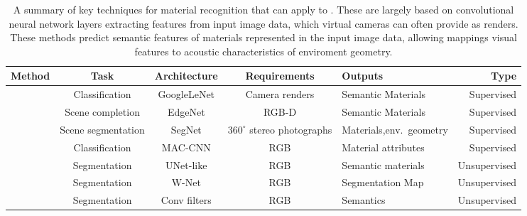 \begin{landscape}
    \begin{table}[tbp]
        \centering
        \caption[A summary of key techniques for material recognition]{A summary of key techniques for material recognition that can apply to . These are largely based on convolutional neural network layers extracting features from input image data, which virtual cameras can often provide as renders. These methods predict semantic features of materials represented in the input image data, allowing mappings visual features to acoustic characteristics of enviroment geometry.}
            
            \begin{tabularx}{\linewidth}{lcccXr}
                \toprule
                Method                                            & Task                     & Architecture   & Requirements             & Outputs             & Type       \\ \midrule
                \cite{schissler2017acoustic}                      & Classification           & GoogleLeNet    & Camera renders           & Semantic Materials  & Supervised \\
                \cite{dourado2019edgenet}                         & Scene completion         & EdgeNet        & RGB-D                    & Semantic Materials  & Supervised \\
                \cite{kim2019immersive}                           & Scene segmentation       & SegNet         & $360^\circ$ stereo \newline{} photographs & Materials,\newline env.\ geometry  & Supervised \\
                
                \cite{schwartz2019recognizing}                    & Classification           & MAC-CNN       & RGB                       & Material attributes  & Supervised \\
                \cite{gaur2019superpixel}                         & Segmentation             & UNet-like     & RGB                       & Semantic materials   & Unsupervised \\
                \cite{xia2017w}                                   & Segmentation             & W-Net         & RGB                       & Segmentation Map     & Unsupervised \\
                \cite{kiechle2018model}                           & Segmentation             & Conv filters  & RGB                       & Semantics            & Unsupervised \\ \bottomrule 
            \end{tabularx}\label{tab:material-recongition-techniques}
        \end{table}

\end{landscape}

